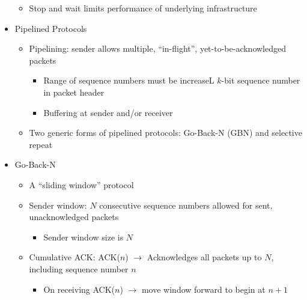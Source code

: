\begin{itemize}
\begin{itemize}
      \item Stop and wait limits performance of underlying infrastructure

    \end{itemize}

  \item Pipelined Protocols

    \begin{itemize}

      \item Pipelining: sender allows multiple, ``in-flight'', yet-to-be-acknowledged packets

        \begin{itemize}

          \item Range of sequence numbers must be increaseL $k$-bit sequence number in packet header

          \item Buffering at sender and/or receiver

        \end{itemize}

      \item Two generic forms of pipelined protocols: Go-Back-N (GBN) and selective repeat

    \end{itemize}

  \item Go-Back-N

    \begin{itemize}

      \item A ``sliding window'' protocol

      \item Sender window: $N$ consecutive sequence numbers allowed for sent, unacknowledged packets

        \begin{itemize}

          \item Sender window size is $N$

        \end{itemize}

      \item Cumulative ACK: ACK($n$) $\to$ Acknowledges all packets up to $N$, including sequence number $n$

        \begin{itemize}

          \item On receiving ACK($n$) $\to$ move window forward to begin at $n+1$


\end{itemize}
\end{itemize}
\end{itemize}
